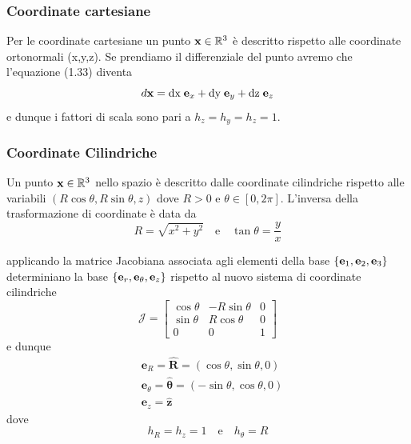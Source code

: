 \subsubsection{Coordinate cartesiane}
Per le coordinate cartesiane un punto $\bold{x} \in \mathbb{R}^3$ \`e descritto rispetto alle coordinate ortonormali (x,y,z). Se prendiamo il differenziale del punto avremo che l'equazione (1.33) diventa
\begin{equation*}
	d\bold{x} = \text{dx} \; \bold{e}_{x} + \text{dy} \; \bold{e}_{y} + \text{dz} \; \bold{e}_{z}
\end{equation*}
e dunque i fattori di scala sono pari a $h_z = h_y = h_z =1$.

\subsubsection{Coordinate Cilindriche}
Un punto $\bold{x} \in \mathbb{R}^3$ nello spazio \`e descritto dalle coordinate cilindriche rispetto alle variabili $(R\cos\theta,R \sin \theta, z)$ dove $R > 0$ e $\theta \in [0,2\pi]$. L'inversa della trasformazione di coordinate \`e data da 
\begin{equation*}
	R = \sqrt {x^2+y^2} \quad \text{e} \quad \tan \theta = \frac{y}{x}
\end{equation*}

applicando la matrice Jacobiana associata agli elementi della base $\{\bold{e}_1,\bold{e}_2,\bold{e}_3\}$ determiniano la base $\{\bold{e}_{r},\bold{e}_{\theta},\bold{e}_{z}\}$ rispetto al nuovo sistema di coordinate cilindriche 
\begin{equation*}
	\mathcal{J} = \left [ \begin{array}{ccc}
		\cos\theta & -R \sin \theta & 0 \\
		\sin \theta & R \cos \theta & 0 \\
		0 & 0 & 1 
	\end{array} \right ]
\end{equation*}
e dunque 
\begin{equation*}
	\begin{aligned}
& \mathbf{e}_R=\hat{\boldsymbol{R}}=(\cos \theta, \sin \theta, 0) \\
& \mathbf{e}_\theta=\hat{\boldsymbol{\theta}}=(-\sin \theta, \cos \theta, 0) \\
& \mathbf{e}_z=\hat{\mathbf{z}}
\end{aligned}
\end{equation*}
dove 
\begin{equation*}
	h_R = h_z =1 \quad \text{e} \quad h_{\theta} = R
\end{equation*}

